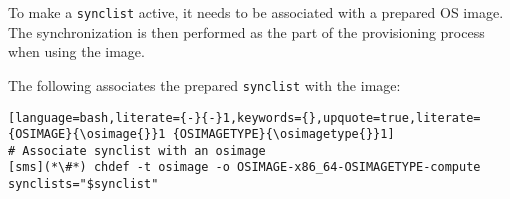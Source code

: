 To make a \texttt{synclist} active, it needs to be associated with a prepared OS
image. The synchronization is then performed as the part of the provisioning
process when using the image.


The following associates the prepared \texttt{synclist} with the \installmode{} \xCAT{} image:

\begin{lstlisting}[language=bash,literate={-}{-}1,keywords={},upquote=true,literate={OSIMAGE}{\osimage{}}1 {OSIMAGETYPE}{\osimagetype{}}1]
# Associate synclist with an osimage
[sms](*\#*) chdef -t osimage -o OSIMAGE-x86_64-OSIMAGETYPE-compute synclists="$synclist"
\end{lstlisting}
